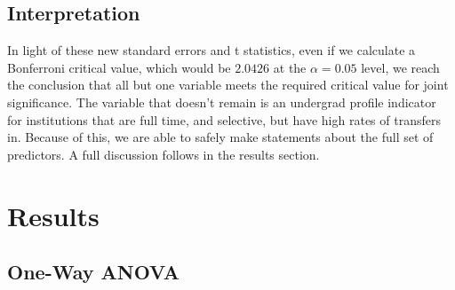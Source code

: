 \documentclass{article}
\begin{document}
\begin{Schunk}
\begin{table}[ht]
\caption{Coefficient Estimation with Robust Standard Errors} 
\end{table}\end{Schunk}

\FloatBarrier

\subsection{Interpretation}

In light of these new standard errors and t statistics, even if we calculate a Bonferroni critical value, which would be $2.0426$ at the $\alpha = 0.05$ level, we reach the conclusion that all but one variable meets the required critical value for joint significance. The variable that doesn't remain is an undergrad profile indicator for institutions that are full time, and selective, but have high rates of transfers in. Because of this, we are able to safely make statements about the full set of predictors. A full discussion follows in the results section.

\section{Results}

\subsection{One-Way ANOVA}
\end{document}
